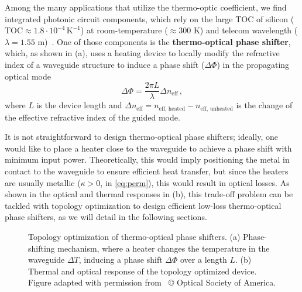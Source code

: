 Among the many applications that utilize the thermo-optic coefficient, we find integrated photonic circuit components, which rely on the large 
TOC of silicon ($\text{TOC} \approx 1.8 \cdot 10^{-4}\, \text{K}^{-1}$) at room-temperature ($\approx300$ K) and telecom wavelength 
($\lambda=1.55$ \textmu m)~\cite{thermo-optic-coef}. One of those components is the \textbf{thermo-optical phase shifter}, which, as shown in  (a),
uses a heating device to locally modify the refractive index of a waveguide structure to induce a phase shift ($\Delta \Phi$) in the propagating optical mode
\begin{equation}\label{eq:phase_shift}
\Delta \Phi = \frac{2\pi L}{\lambda} \Delta n_\text{eff}\,,
\end{equation}
where $L$ is the device length and $\Delta n_\text{eff} = n_\text{eff, heated} - n_\text{eff, unheated}$
 is the change of the effective refractive index of the guided mode. 
 
 It is not straightforward to design thermo-optical phase shifters; ideally, one would like to place a heater close to the waveguide to achieve a phase shift with minimum input power.
 Theoretically, this would imply positioning the metal in contact to the waveguide to ensure efficient heat transfer, but since the heaters are usually metallic ($\kappa > 0$, in \eqref{eq:perm}), this would result
 in optical losses. As shown in the optical and thermal responses in  (b), this trade-off problem can be tackled with topology optimization to design efficient low-loss thermo-optical phase shifters, 
 as we will detail in the following sections.

\begin{figure}[tb]
    \centering
    \caption{Topology optimization of thermo-optical phase shifters. (a) Phase-shifting mechanism, where a heater changes the temperature in the waveguide $\Delta T$, inducing a phase shift
    $\Delta \Phi$ over a length $L$. (b) Thermal and optical response of the topology optimized device. Figure adapted with permission from~\cite{ownpub0} © Optical Society of America.}
    \label{fig:thermo_res}
\end{figure}


